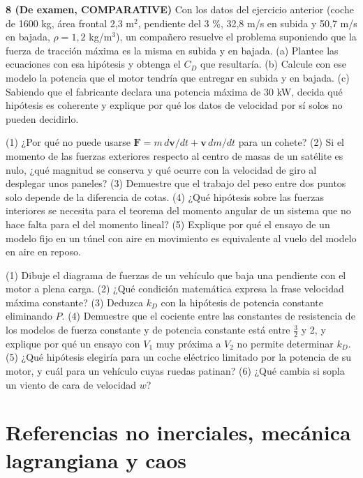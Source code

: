 \documentclass[10pt,openany]{book}
\begin{document}
\begin{tcolorbox}[title={Ejercicios propuestos}, studiumworked, breakable]
\noindent\textbf{8 (De examen, COMPARATIVE)}
Con los datos del ejercicio anterior (coche de 1600 kg, área frontal 2,3 m\(^2\), pendiente del 3 \%, 32,8 m/s en subida y 50,7 m/s en bajada, \(\rho = 1{,}2\) kg/m\(^3\)), un compañero resuelve el problema suponiendo que la fuerza de tracción máxima es la misma en subida y en bajada. (a) Plantee las ecuaciones con esa hipótesis y obtenga el \(C_D\) que resultaría. (b) Calcule con ese modelo la potencia que el motor tendría que entregar en subida y en bajada. (c) Sabiendo que el fabricante declara una potencia máxima de 30 kW, decida qué hipótesis es coherente y explique por qué los datos de velocidad por sí solos no pueden decidirlo.
\end{tcolorbox}

\begin{tcolorbox}[title={Autoevaluación}, studiumcheck, breakable]

(1) ¿Por qué no puede usarse \(\mathbf{F} = m\,d\mathbf{v}/dt + \mathbf{v}\,dm/dt\) para un cohete? (2) Si el momento de las fuerzas exteriores respecto al centro de masas de un satélite es nulo, ¿qué magnitud se conserva y qué ocurre con la velocidad de giro al desplegar unos paneles? (3) Demuestre que el trabajo del peso entre dos puntos solo depende de la diferencia de cotas. (4) ¿Qué hipótesis sobre las fuerzas interiores se necesita para el teorema del momento angular de un sistema que no hace falta para el del momento lineal? (5) Explique por qué el ensayo de un modelo fijo en un túnel con aire en movimiento es equivalente al vuelo del modelo en aire en reposo.

(1) Dibuje el diagrama de fuerzas de un vehículo que baja una pendiente con el motor a plena carga. (2) ¿Qué condición matemática expresa la frase velocidad máxima constante? (3) Deduzca \(k_D\) con la hipótesis de potencia constante eliminando \(P\). (4) Demuestre que el cociente entre las constantes de resistencia de los modelos de fuerza constante y de potencia constante está entre \(\tfrac{3}{2}\) y 2, y explique por qué un ensayo con \(V_1\) muy próxima a \(V_2\) no permite determinar \(k_D\). (5) ¿Qué hipótesis elegiría para un coche eléctrico limitado por la potencia de su motor, y cuál para un vehículo cuyas ruedas patinan? (6) ¿Qué cambia si sopla un viento de cara de velocidad \(w\)?
\end{tcolorbox}
\studiumchaptercheck

\chapter{Referencias no inerciales, mecánica lagrangiana y caos}
\label{chap:c02}
\end{document}
